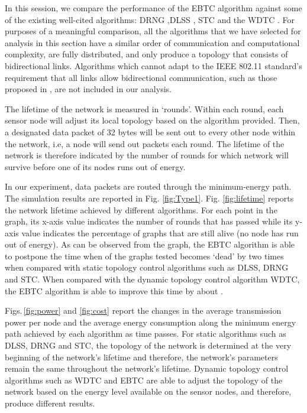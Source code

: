 \documentclass[journal,12pt,onecolumn]{IEEEtran}
\begin{document}
In this session, we compare the performance of the EBTC algorithm
against some of the existing well-cited algorithms: DRNG \cite{LiHou2005-1313},DLSS \cite{LiHou2005-1313}, STC \cite{SetGer2010} and the
WDTC \cite{SunYua2011}. For
purposes of a meaningful comparison, all the algorithms that we have
selected for analysis in this section have a similar order of
communication and computational complexity, are fully distributed, and
only produce a topology that consists of bidirectional
links. Algorithms which cannot adapt to the IEEE 802.11 standard's
requirement that all links allow bidirectional communication, such
as those proposed in \cite{ChuSet2012}, are not included in our analysis.




The lifetime of the network is measured in `rounds'. Within each
round, each sensor node will adjust its local topology based on the
algorithm provided. Then, a designated data packet of 32 bytes will be
sent out to every other node within the network, i.e, a node will send
out  packets each round. The lifetime of the network is therefore
indicated by the number of rounds for which network will survive
before one of its nodes runs out of energy.

In our experiment, data packets are routed through the minimum-energy
path. The simulation results are reported in
Fig.\,\,\ref{fig:Type1}. Fig.\,\,\ref{fig:lifetime} reports the
network lifetime achieved by different algorithms. For each point in
the graph, its x-axis value indicates the number of rounds that has
passed while its y-axis value indicates the percentage of graphs that
are still alive (no node has run out of energy). As can be observed
from the graph, the EBTC algorithm is able to postpone the time when
 of the graphs tested becomes `dead' by two times when compared
with static topology control algorithms such as DLSS, DRNG and STC. When
compared with the dynamic topology control algorithm WDTC, the EBTC
algorithm is able to improve this time by about .

Figs.\,\ref{fig:power} and \ref{fig:cost} report the changes in the
average transmission power per node and the average energy
consumption along the minimum energy path achieved by each algorithm
as time passes. For static algorithms such as DLSS, DRNG and STC,
the topology of the network is determined at the very beginning of
the network's lifetime and therefore, the network's parameters
remain the same throughout the network's lifetime. Dynamic topology
control algorithms such as WDTC and EBTC are able to adjust the
topology of the network based on the energy level available on the
sensor nodes, and therefore, produce different results.
\end{document}
